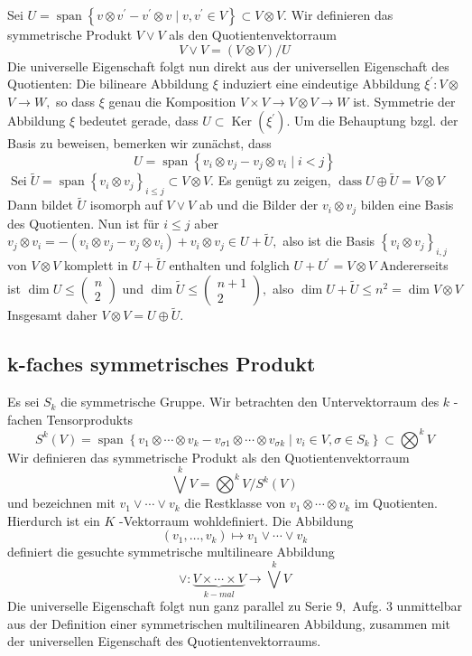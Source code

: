Sei $U=\operatorname{span}\left\{v \otimes v^{\prime}-v^{\prime} \otimes v \mid v, v^{\prime} \in V\right\} \subset V \otimes V .$ Wir definieren das symmetrische
Produkt $V \vee V$ als den Quotientenvektorraum
$$
V \vee V=(V \otimes V) / U
$$
Die universelle Eigenschaft folgt nun direkt aus der universellen Eigenschaft des Quotienten: Die bilineare Abbildung $\xi$ induziert eine eindeutige Abbildung $\xi^{\prime}: V \otimes$ $V \rightarrow W,$ so dass $\xi$ genau die Komposition $V \times V \rightarrow V \otimes V \rightarrow W$ ist. Symmetrie der Abbildung $\xi$ bedeutet gerade, dass $U \subset \operatorname{Ker}\left(\xi^{\prime}\right) .$
Um die Behauptung bzgl. der Basis zu beweisen, bemerken wir zunächst, dass
$$
U=\operatorname{span}\left\{v_{i} \otimes v_{j}-v_{j} \otimes v_{i} \mid i<j\right\}
$$
$\operatorname{Sei} \tilde{U}=\operatorname{span}\left\{v_{i} \otimes v_{j}\right\}_{i \leqslant j} \subset V \otimes V .$ Es genügt zu zeigen, $\operatorname{dass} U \oplus \tilde{U}=V \otimes V$
Dann bildet $\tilde{U}$ isomorph auf $V \vee V$ ab und die Bilder der $v_{i} \otimes v_{j}$ bilden eine Basis des Quotienten.
Nun ist für $i \leqslant j$ aber $v_{j} \otimes v_{i}=-\left(v_{i} \otimes v_{j}-v_{j} \otimes v_{i}\right)+v_{i} \otimes v_{j} \in U+\tilde{U},$ also ist die Basis
$\left\{v_{i} \otimes v_{j}\right\}_{i, j}$ von $V \otimes V$ komplett in $U+\tilde{U}$ enthalten und folglich $U+U^{\prime}=V \otimes V$ Andererseits ist $\operatorname{dim} U \leqslant\left(\begin{array}{c}n \\ 2\end{array}\right)$ und $\operatorname{dim} \tilde{U} \leqslant\left(\begin{array}{c}n+1 \\ 2\end{array}\right),$ also $\operatorname{dim} U+\tilde{U} \leqslant n^{2}=\operatorname{dim} V \otimes V$
Insgesamt daher $V \otimes V=U \oplus \tilde{U}$.


\subsection{k-faches symmetrisches Produkt}

Es sei $S_{k}$ die symmetrische Gruppe. Wir betrachten den Untervektorraum des $k$ -fachen Tensorprodukts
$$
S^{k}(V)=\operatorname{span}\left\{v_{1} \otimes \cdots \otimes v_{k}-v_{\sigma 1} \otimes \cdots \otimes v_{\sigma k} \mid v_{i} \in V, \sigma \in S_{k}\right\} \subset \bigotimes^{k} V
$$
Wir definieren das symmetrische Produkt als den Quotientenvektorraum
$$
\bigvee^{k} V=\bigotimes^{k} V / S^{k}(V)
$$
und bezeichnen mit $v_{1} \vee \cdots \vee v_{k}$ die Restklasse von $v_{1} \otimes \cdots \otimes v_{k}$ im Quotienten. Hierdurch ist ein $K$ -Vektorraum wohldefiniert. Die Abbildung
$$
\left(v_{1}, \ldots, v_{k}\right) \mapsto v_{1} \vee \cdots \vee v_{k}
$$
definiert die gesuchte symmetrische multilineare Abbildung
$$
\vee: \underbrace{V \times \cdots \times V}_{k-m a l} \rightarrow \bigvee^{k} V
$$
Die universelle Eigenschaft folgt nun ganz parallel zu Serie $9,$ Aufg. 3 unmittelbar aus der Definition einer symmetrischen multilinearen Abbildung, zusammen mit der universellen Eigenschaft des Quotientenvektorraums.


